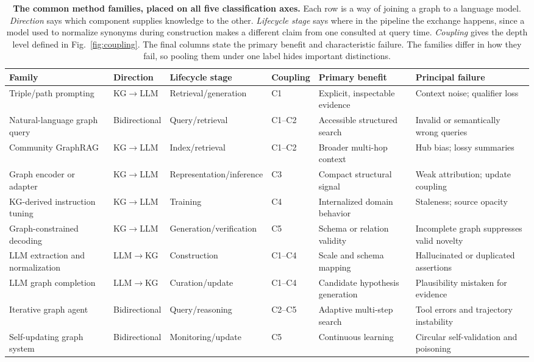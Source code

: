 \begin{table}[!t]
\centering
\caption{\textbf{The common method families, placed on all five classification axes.} Each row is a way of joining a graph to a language model. \emph{Direction} says which component supplies knowledge to the other. \emph{Lifecycle stage} says where in the pipeline the exchange happens, since a model used to normalize synonyms during construction makes a different claim from one consulted at query time. \emph{Coupling} gives the depth level defined in Fig.~\ref{fig:coupling}. The final columns state the primary benefit and characteristic failure. The families differ in how they fail, so pooling them under one label hides important distinctions.}
\label{tab:taxonomy}
\footnotesize
\begin{tabularx}{\textwidth}{@{}L{3.2cm} L{2.2cm} L{2.6cm} L{1.2cm} Y Y@{}}
\toprule
\textbf{Family} & \textbf{Direction} & \textbf{Lifecycle stage} & \textbf{Coupling} & \textbf{Primary benefit} & \textbf{Principal failure} \\
\midrule
Triple/path prompting & KG$\rightarrow$LLM & Retrieval/generation & C1 & Explicit, inspectable evidence & Context noise; qualifier loss \\
Natural-language graph query & Bidirectional & Query/retrieval & C1--C2 & Accessible structured search & Invalid or semantically wrong queries \\
Community GraphRAG & KG$\rightarrow$LLM & Index/retrieval & C1--C2 & Broader multi-hop context & Hub bias; lossy summaries \\
Graph encoder or adapter & KG$\rightarrow$LLM & Representation/inference & C3 & Compact structural signal & Weak attribution; update coupling \\
KG-derived instruction tuning & KG$\rightarrow$LLM & Training & C4 & Internalized domain behavior & Staleness; source opacity \\
Graph-constrained decoding & KG$\rightarrow$LLM & Generation/verification & C5 & Schema or relation validity & Incomplete graph suppresses valid novelty \\
LLM extraction and normalization & LLM$\rightarrow$KG & Construction & C1--C4 & Scale and schema mapping & Hallucinated or duplicated assertions \\
LLM graph completion & LLM$\rightarrow$KG & Curation/update & C1--C4 & Candidate hypothesis generation & Plausibility mistaken for evidence \\
Iterative graph agent & Bidirectional & Query/reasoning & C2--C5 & Adaptive multi-step search & Tool errors and trajectory instability \\
Self-updating graph system & Bidirectional & Monitoring/update & C5 & Continuous learning & Circular self-validation and poisoning \\
\bottomrule
\end{tabularx}
\end{table}
